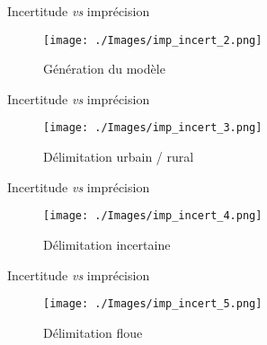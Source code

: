 \documentclass{beamer}
\begin{document}
\begin{frame}{Incertitude \emph{vs} imprécision}
		\begin{figure}
		\centering
		\texttt{[image: ./Images/imp\_incert\_2.png]}
		\caption{Génération du modèle}
		\end{figure}
\end{frame}

\begin{frame}{Incertitude \emph{vs} imprécision}
		\begin{figure}
		\centering
		\texttt{[image: ./Images/imp\_incert\_3.png]}
		\caption{Délimitation urbain / rural}
		\end{figure}
\end{frame}


\begin{frame}{Incertitude \emph{vs} imprécision}
		\begin{figure}
		\centering
		\texttt{[image: ./Images/imp\_incert\_4.png]}
		\caption{Délimitation incertaine}
		\end{figure}
\end{frame}



\begin{frame}{Incertitude \emph{vs} imprécision}
		\begin{figure}
		\centering
		\texttt{[image: ./Images/imp\_incert\_5.png]}
		\caption{Délimitation floue}
		\end{figure}
\end{frame}
\end{document}
